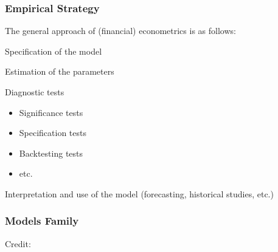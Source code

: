 \documentclass{beamer}
\newenvironment{wideenumerate}{\enumerate\addtolength{\itemsep}{10pt}}{\endenumerate}
\begin{document}
\begin{frame}
  \frametitle{Empirical Strategy}
  The general approach of (financial) econometrics is as follows:\\
  \smallskip

  \begin{wideenumerate}
  \item Specification of the model
  \item Estimation of the parameters
  \item Diagnostic tests
    \begin{itemize}
    \item Significance tests
    \item Specification tests
    \item Backtesting tests
    \item etc.
    \end{itemize}
  \item Interpretation and use of the model (forecasting, historical studies, etc.)
  \end{wideenumerate}
\end{frame}

  \begin{frame}
  \frametitle{Models Family}
  \hspace*{15pt}\hbox{\scriptsize Credit:}
\end{frame}
\end{document}
